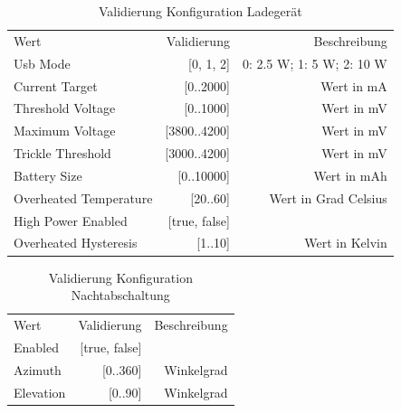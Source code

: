 \begin{table}[H]
    \begin{center}
      \begin{tabular}{|l|r|r|}
        \hline
        Wert          & Validierung & Beschreibung\\
        \Xhline{3\arrayrulewidth}
        Usb Mode & [0, 1, 2] & 0: 2.5 W; 1: 5 W; 2: 10 W \\
        \hline
        Current Target      & [0..2000]   & Wert in mA \\
        \hline
        Threshold Voltage   & [0..1000] & Wert in mV \\
        \hline
        Maximum Voltage   & [3800..4200] & Wert in mV \\
        \hline
        Trickle Threshold   & [3000..4200] & Wert in mV \\
        \hline
        Battery Size   & [0..10000] & Wert in mAh \\
        \hline
        Overheated Temperature   & [20..60] & Wert in Grad Celsius \\
        \hline
        High Power Enabled   & [true, false] &  \\
        \hline
        Overheated Hysteresis   & [1..10] & Wert in Kelvin \\
        \hline
      \end{tabular}
      \caption{Validierung Konfiguration Ladegerät}
    \end{center}
  \end{table}

  \begin{table}[H]
    \begin{center}
      \begin{tabular}{|l|r|r|}
        \hline
        Wert          & Validierung & Beschreibung\\
        \Xhline{3\arrayrulewidth}
        Enabled & [true, false] &  \\
        \hline
        Azimuth      & [0..360]   & Winkelgrad \\
        \hline
        Elevation   & [0..90] & Winkelgrad \\
        \hline
      \end{tabular}
      \caption{Validierung Konfiguration Nachtabschaltung}
    \end{center}
  \end{table}

